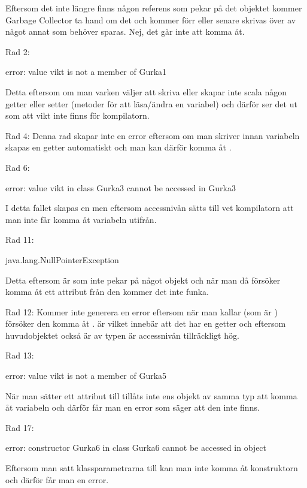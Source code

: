 \Subtask Eftersom det inte längre finns någon referens som pekar på det objektet kommer Garbage Collector ta hand om det och kommer förr eller senare skrivas över av något annat som behöver sparas. Nej, det går inte att komma åt.

\Task Rad 2: 
\begin{REPL}
	error: value vikt is not a member of Gurka1
\end{REPL}
Detta eftersom om man varken väljer att skriva  eller  skapar inte scala någon getter eller setter (metoder för att läsa/ändra en variabel) och därför ser det ut som att vikt inte finns för kompilatorn.

Rad 4: Denna rad skapar inte en error eftersom om man skriver  innan variabeln skapas en getter automatiskt och man kan därför komma åt .

Rad 6: 
\begin{REPL}
	error: value vikt in class Gurka3 cannot be accessed in Gurka3
\end{REPL} 
I detta fallet skapas en  men eftersom accessnivån sätts till  vet kompilatorn att man inte får komma åt variabeln utifrån.

Rad 11: 
\begin{REPL}
	java.lang.NullPointerException
\end{REPL} 
Detta eftersom  är  som inte pekar på något objekt och när man då försöker komma åt ett attribut från den kommer det inte funka.

Rad 12: Kommer inte generera en error eftersom när man kallar  (som är ) försöker den komma åt .  är  vilket innebär att det har en getter och eftersom huvudobjektet också är av typen  är accessnivån tillräckligt hög.

Rad 13: 
\begin{REPL}
	error: value vikt is not a member of Gurka5
\end{REPL} 
När man sätter ett attribut till  tillåts inte ens objekt av samma typ att komma åt variabeln och därför får man en error som säger att den inte finns.

Rad 17: 
\begin{REPL}
	error: constructor Gurka6 in class Gurka6 cannot be accessed in object
\end{REPL} 
Eftersom man satt klassparametrarna till  kan man inte komma åt konstruktorn och därför får man en error.

